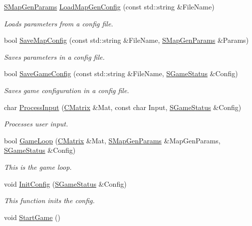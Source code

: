\begin{DoxyCompactItemize}
\item 
\hyperlink{struct_chase_game_1_1_s_map_gen_params}{S\-Map\-Gen\-Params} \hyperlink{namespace_chase_game_a9c5b5d91cb4251cae461faa4ace8a0cf}{Load\-Map\-Gen\-Config} (const std\-::string \&File\-Name)
\begin{DoxyCompactList}\small\item\em Loads parameters from a config file. \end{DoxyCompactList}\item 
bool \hyperlink{namespace_chase_game_a4c62f61c6aac5bf06292aa51294fd211}{Save\-Map\-Config} (const std\-::string \&File\-Name, \hyperlink{struct_chase_game_1_1_s_map_gen_params}{S\-Map\-Gen\-Params} \&Params)
\begin{DoxyCompactList}\small\item\em Saves parameters in a config file. \end{DoxyCompactList}\item 
bool \hyperlink{namespace_chase_game_a561c85a018e34c8baa21f7f500a3c9c7}{Save\-Game\-Config} (const std\-::string \&File\-Name, \hyperlink{struct_chase_game_1_1_s_game_status}{S\-Game\-Status} \&Config)
\begin{DoxyCompactList}\small\item\em Saves game configuration in a config file. \end{DoxyCompactList}\item 
char \hyperlink{namespace_chase_game_ab5112517855da810fe3b7bdb81d58484}{Process\-Input} (\hyperlink{namespace_chase_game_a469449f9237e59efce3982127366c550}{C\-Matrix} \&Mat, const char Input, \hyperlink{struct_chase_game_1_1_s_game_status}{S\-Game\-Status} \&Config)
\begin{DoxyCompactList}\small\item\em Processes user input. \end{DoxyCompactList}\item 
bool \hyperlink{namespace_chase_game_a2bf846fb0618a485e9054b26555ed484}{Game\-Loop} (\hyperlink{namespace_chase_game_a469449f9237e59efce3982127366c550}{C\-Matrix} \&Mat, \hyperlink{struct_chase_game_1_1_s_map_gen_params}{S\-Map\-Gen\-Params} \&Map\-Gen\-Params, \hyperlink{struct_chase_game_1_1_s_game_status}{S\-Game\-Status} \&Config)
\begin{DoxyCompactList}\small\item\em This is the game loop. \end{DoxyCompactList}\item 
void \hyperlink{namespace_chase_game_adab063b49bbe754d7cd4992b72da3746}{Init\-Config} (\hyperlink{struct_chase_game_1_1_s_game_status}{S\-Game\-Status} \&Config)
\begin{DoxyCompactList}\small\item\em This function inits the config. \end{DoxyCompactList}\item 
\hypertarget{namespace_chase_game_a528073d13296b3cf84a6ae07c3550e74}{void \hyperlink{namespace_chase_game_a528073d13296b3cf84a6ae07c3550e74}{Start\-Game} ()}\label{namespace_chase_game_a528073d13296b3cf84a6ae07c3550e74}


\end{DoxyCompactItemize}
